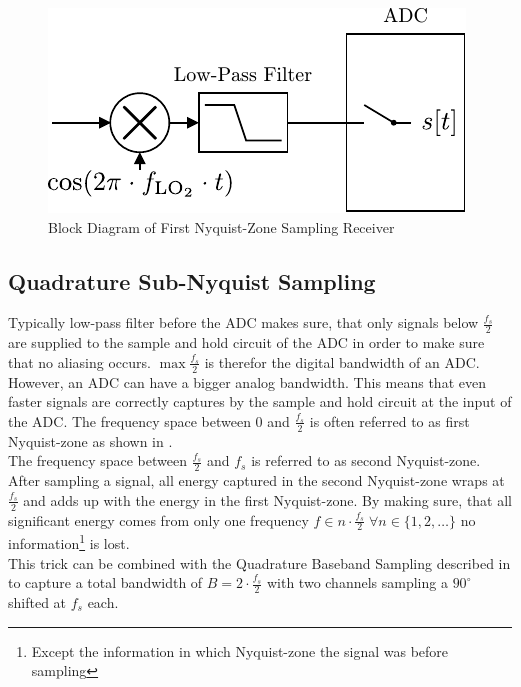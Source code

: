 \begin{figure}[h!]
  \centering
  \includegraphics[width=\textwidth]{figures/rx_adc_0_bd}
  \caption{Block Diagram of First Nyquist-Zone Sampling Receiver}
  \label{fig:rx_adc_0_bd}
\end{figure}

\subsection{Quadrature Sub-Nyquist Sampling}
\label{sec:rx_adc_2}
Typically low-pass filter before the \gls{ADC} makes sure, that only
signals below $\frac{f_s}{2}$ are supplied to the sample and hold circuit
of the \gls{ADC} in order to make sure that no aliasing occurs.
$\max \frac{f_s}{2}$ is therefor the digital bandwidth of an \gls{ADC}. \\

However, an \gls{ADC} can have a bigger analog bandwidth. This means that
even faster signals are correctly captures by the sample and hold circuit
at the input of the \gls{ADC}. The frequency space between 0 and
$\frac{f_s}{2}$ is often referred to as first Nyquist-zone as shown in
. \\
The frequency space between $\frac{f_s}{2}$ and $f_s$ is referred to as
second Nyquist-zone. After sampling a signal, all energy captured in the
second Nyquist-zone wraps at $\frac{f_s}{2}$ and adds up with the energy
in the first Nyquist-zone. By making sure, that all significant energy
comes from only one frequency
$f \in n \cdot \frac{f_s}{2} \; \forall n \in \{1, 2, \dots\}$
no information\footnote{Except the information in which
  Nyquist-zone the signal was before sampling} is lost. \\

This trick can be combined with the Quadrature Baseband Sampling described
in  to capture a total bandwidth of
$B = 2 \cdot \frac{f_s}{2}$ with two channels sampling a $90^\circ$ shifted
at $f_s$ each. \\

